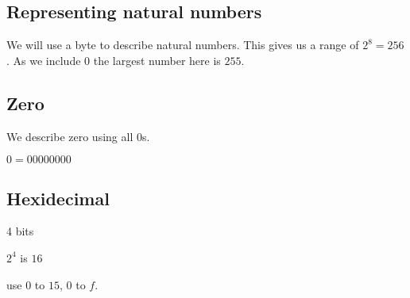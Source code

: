 
\subsection{Representing natural numbers}

We will use a byte to describe natural numbers. This gives us a range of \(2^8=256\). As we include \(0\) the largest number here is \(255\).

\subsection{Zero}

We describe zero using all \(0\)s.

\(0=00000000\)

\subsection{Hexidecimal}

4 bits

\(2^4\) is \(16\)

use \(0\) to \(15\), \(0\) to \(f\).

